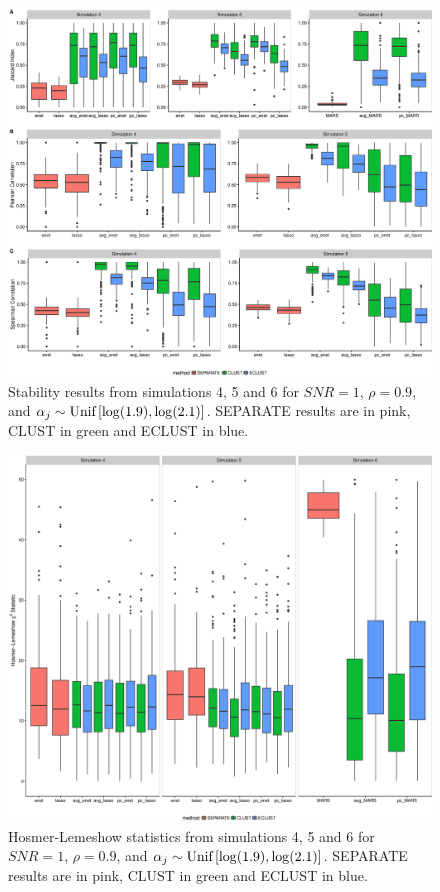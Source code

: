 \begin{figure}[H]
	\centering
	\includegraphics[scale=0.40, keepaspectratio]{./figs/guillimin/results/figures/sim4-5-6-combined/stability_sim456.eps}
	\caption{Stability results from simulations 4, 5 and 6 for $SNR=1$, $\rho = 0.9$, and \mbox{$\alpha_{j} \sim \textrm{{Unif}}\left[\log(1.9), \log(2.1)\right]$}. SEPARATE results are in pink, CLUST in green and ECLUST in blue.}
	\label{fig:sim-stability456}
\end{figure}

\begin{figure}[H]
	\centering
	\includegraphics[scale=0.40, keepaspectratio]{./figs/guillimin/results/figures/sim4-5-6-combined/calibration_sim456.eps}
	\caption{Hosmer-Lemeshow statistics from simulations 4, 5 and 6 for $SNR=1$, $\rho = 0.9$, and \mbox{$\alpha_{j} \sim \textrm{{Unif}}\left[\log(1.9), \log(2.1)\right]$}. SEPARATE results are in pink, CLUST in green and ECLUST in blue.}
	\label{fig:sim-calibration456}
\end{figure}


